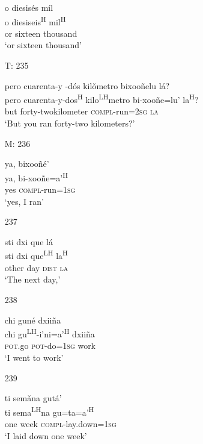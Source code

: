 \begin{itemize}
\glll   o diesis\'{e}s m\'{i}l \\
 o diesiseis\textsuperscript{H} mil\textsuperscript{H} \\
or sixteen thousand \\
\glt `or sixteen thousand'
 


\item[T: 235]
 
\glll   pero cuarenta-y -d\'{o}s kil\v{o}metro bixoo\~{n}elu l\'{a}? \\
pero cuarenta-y-dos\textsuperscript{H} kilo\textsuperscript{LH}metro bi-xoo\~{n}e=lu' la\textsuperscript{H}? \\
but forty-twokilometer \textsc{compl}-run=\textsc{2sg} \textsc{la} \\
\glt `But you ran forty-two kilometers?'
 

\item[M: 236]
 
\glll   ya, bixoo\~{n}\'{e}' \\
 ya, bi-xoo\~{n}e=a'\textsuperscript{H} \\
yes \textsc{compl}-run=\textsc{1sg} \\
\glt `yes, I ran'
 



\item[237]

\glll   sti dxi que l\'{a} \\
 sti dxi que\textsuperscript{LH} la\textsuperscript{H} \\
other day \textsc{dist} \textsc{la} \\
\glt `The next day,'
 

\item[238]
 
\glll   chi gun\'{e} dxii\~{n}a \\
  chi gu\textsuperscript{LH}-i'ni=a'\textsuperscript{H} dxii\~{n}a \\
\textsc{pot}.go \textsc{pot}-do=\textsc{1sg} work \\
\glt `I went to work'
 



\item[239]
 
\glll   ti sem\v{a}na gut\'{a}' \\
 ti sema\textsuperscript{LH}na gu=ta=a'\textsuperscript{H} \\
one week \textsc{compl}-lay.down=\textsc{1sg} \\
\glt `I laid down one week' 
 



\end{itemize}
